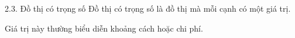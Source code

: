 \documentclass{beamer}
\begin{document}
\begin{frame}{2.3. Đồ thị có trọng số}
\Large
Đồ thị có trọng số là đồ thị mà mỗi cạnh có một giá trị.

\vspace{0.3cm}
Giá trị này thường biểu diễn khoảng cách hoặc chi phí.
\end{frame}
\end{document}
